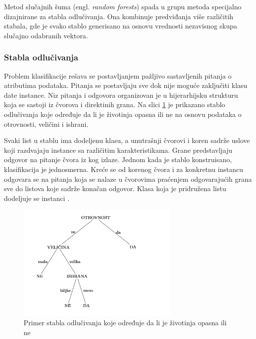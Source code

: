 Metod slučajnih šuma (engl. \textit{random forests}) spada u grupu metoda specijalno dizajnirane za stabla odlučivanja. Ona kombinuje predviđanja više različitih stabala, gde je svako stablo generisano na osnovu vrednosti nezavisnog skupa slučajno odabranih vektora.

\subsubsection{Stabla odlučivanja}
 
Problem klasifikacije rešava se postavljanjem pažljivo sastavljenih pitanja o atributima podataka. Pitanja se postavljaju sve dok nije moguće zaključiti klasu date instance. Niz pitanja i odgovora organizovan je u hijerarhijsku strukturu koja se sastoji iz čvorova i direktinih grana. Na slici \ref{fig:tree} je prikazano stablo odlučivanja koje određuje da li je životinja opasna ili ne na osnovu podataka o otrovnosti, veličini i ishrani. 

Svaki list u stablu ima dodeljenu klasu, a unutrašnji čvorovi i koren sadrže uslove koji razdvajaju instance sa različitim karakteristikama. Grane predstavljaju odgovor na pitanje čvora iz kog izlaze. Jednom kada je stablo konstruisano, klasifikacija je jednosmerna. Kreće se od korenog čvora i za konkretnu instancu odgovara se na pitanja koja se nalaze u čvorovima praćenjem odgovarajućih grana sve do listova koje sadrže konačan odgovor. Klasa koja je pridružena listu dodeljuje se instanci \cite{introDM}.


\begin{figure}[h]
	\centering
	\includegraphics[width=0.7\textwidth]{Figures/tree.png}
	\caption{Primer stabla odlučivanja koje određuje da li je životinja opasna ili ne \cite{vi}}
	\label{fig:tree}
\end{figure}



